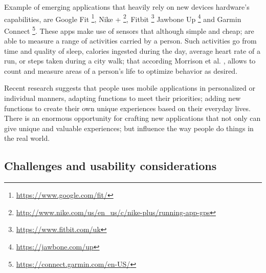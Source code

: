 Example of emerging applications that heavily rely on new devices hardware's capabilities, are Google Fit \footnote{\url{https://www.google.com/fit/}}, Nike + \footnote{\url{http://www.nike.com/us/en_us/c/nike-plus/running-app-gps}}, Fitbit \footnote{\url{https://www.fitbit.com/uk}} Jawbone Up \footnote{\url{https://jawbone.com/up}} and Garmin Connect \footnote{\url{https://connect.garmin.com/en-US/}}. These apps make use of sensors that although simple and cheap; are able to measure a range of activities carried by a person. Such activities go from time and quality of sleep, calories ingested during the day, average heart rate of a run, or steps taken during a city walk; that according Morrison et al. \cite{Rooksby2014},  allows to count and measure areas of a person's life to optimize behavior as desired.

Recent research \cite{Barkhuus2011} suggests that people uses mobile applications in personalized or individual manners, adapting functions to meet their priorities; adding  new functions to create their own unique experiences based on their everyday lives. There is an enormous opportunity for crafting new applications that not only can give unique and valuable experiences; but influence the way people do things in the real world. 

\subsection{Challenges and usability considerations}

